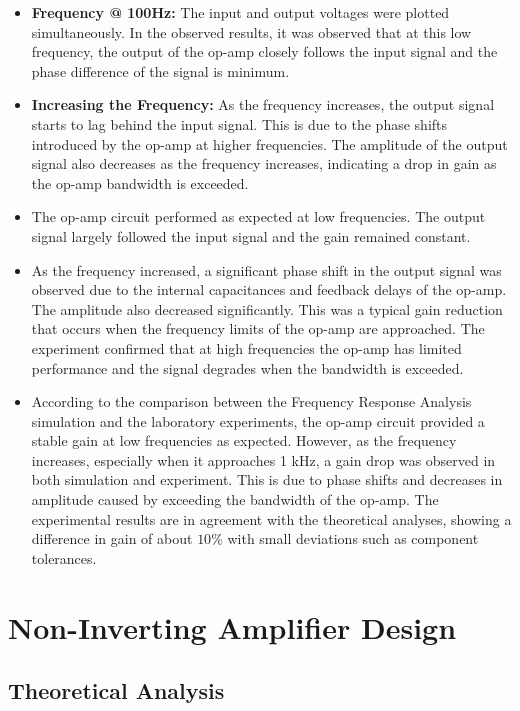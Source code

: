 \begin{itemize}
    \item \textbf{Frequency @ 100Hz:} The input and output voltages were plotted simultaneously. In the observed results, it was observed that at this low frequency, the output of the op-amp closely follows the input signal and the phase difference of the signal is minimum.
    \newpage
    \thispagestyle{plain}
    \item \textbf{Increasing the Frequency:} As the frequency increases, the output signal starts to lag behind the input signal. This is due to the phase shifts introduced by the op-amp at higher frequencies. The amplitude of the output signal also decreases as the frequency increases, indicating a drop in gain as the op-amp bandwidth is exceeded.
    \item The op-amp circuit performed as expected at low frequencies. The output signal largely followed the input signal and the gain remained constant.
    \item As the frequency increased, a significant phase shift in the output signal was observed due to the internal capacitances and feedback delays of the op-amp. The amplitude also decreased significantly. This was a typical gain reduction that occurs when the frequency limits of the op-amp are approached. The experiment confirmed that at high frequencies the op-amp has limited performance and the signal degrades when the bandwidth is exceeded.
    \item According to the comparison between the Frequency Response Analysis simulation and the laboratory experiments, the op-amp circuit provided a stable gain at low frequencies as expected. However, as the frequency increases, especially when it approaches 1 kHz, a gain drop was observed in both simulation and experiment. This is due to phase shifts and decreases in amplitude caused by exceeding the bandwidth of the op-amp. The experimental results are in agreement with the theoretical analyses, showing a difference in gain of about $10\%$ with small deviations such as component tolerances.
\end{itemize}

\newpage{}
\thispagestyle{plain}

\section{Non-Inverting Amplifier Design}

\subsection{Theoretical Analysis}


